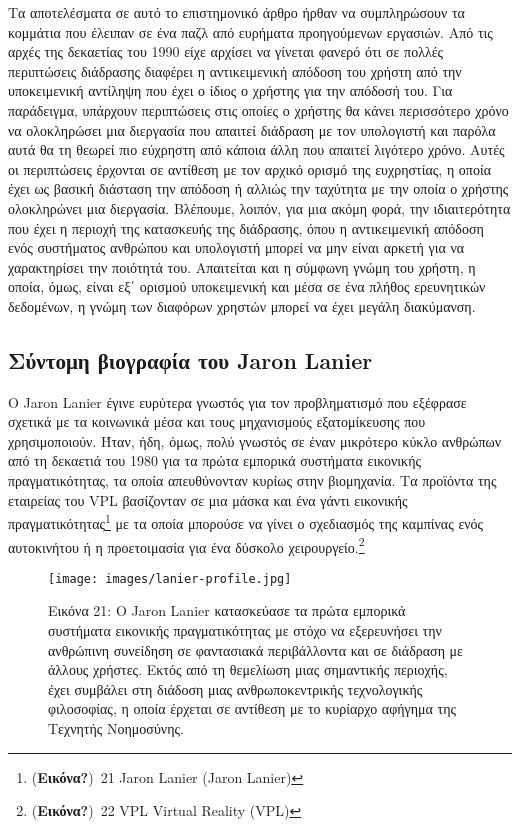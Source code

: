 \documentclass[
]{article}
\begin{document}
Τα αποτελέσματα σε αυτό το επιστημονικό άρθρο ήρθαν να συμπληρώσουν τα
κομμάτια που έλειπαν σε ένα παζλ από ευρήματα προηγούμενων εργασιών. Από
τις αρχές της δεκαετίας του 1990 είχε αρχίσει να γίνεται φανερό ότι σε
πολλές περιπτώσεις διάδρασης διαφέρει η αντικειμενική απόδοση του χρήστη
από την υποκειμενική αντίληψη που έχει ο ίδιος ο χρήστης για την απόδοσή
του. Για παράδειγμα, υπάρχουν περιπτώσεις στις οποίες ο χρήστης θα κάνει
περισσότερο χρόνο να ολοκληρώσει μια διεργασία που απαιτεί διάδραση με
τον υπολογιστή και παρόλα αυτά θα τη θεωρεί πιο εύχρηστη από κάποια άλλη
που απαιτεί λιγότερο χρόνο. Αυτές οι περιπτώσεις έρχονται σε αντίθεση με
τον αρχικό ορισμό της ευχρηστίας, η οποία έχει ως βασική διάσταση την
απόδοση ή αλλιώς την ταχύτητα με την οποία ο χρήστης ολοκληρώνει μια
διεργασία. Βλέπουμε, λοιπόν, για μια ακόμη φορά, την ιδιαιτερότητα που
έχει η περιοχή της κατασκευής της διάδρασης, όπου η αντικειμενική
απόδοση ενός συστήματος ανθρώπου και υπολογιστή μπορεί να μην είναι
αρκετή για να χαρακτηρίσει την ποιότητά του. Απαιτείται και η σύμφωνη
γνώμη του χρήστη, η οποία, όμως, είναι εξ΄ ορισμού υποκειμενική και μέσα
σε ένα πλήθος ερευνητικών δεδομένων, η γνώμη των διαφόρων χρηστών μπορεί
να έχει μεγάλη διακύμανση.

\hypertarget{ux3c3ux3cdux3bdux3c4ux3bfux3bcux3b7-ux3b2ux3b9ux3bfux3b3ux3c1ux3b1ux3c6ux3afux3b1-ux3c4ux3bfux3c5-jaron-lanier}{%
\subsection{Σύντομη βιογραφία του Jaron
Lanier}\label{ux3c3ux3cdux3bdux3c4ux3bfux3bcux3b7-ux3b2ux3b9ux3bfux3b3ux3c1ux3b1ux3c6ux3afux3b1-ux3c4ux3bfux3c5-jaron-lanier}}

Ο Jaron Lanier έγινε ευρύτερα γνωστός για τον προβληματισμό που εξέφρασε
σχετικά με τα κοινωνικά μέσα και τους μηχανισμούς εξατομίκευσης που
χρησιμοποιούν. Ήταν, ήδη, όμως, πολύ γνωστός σε έναν μικρότερο κύκλο
ανθρώπων από τη δεκαετιά του 1980 για τα πρώτα εμπορικά συστήματα
εικονικής πραγματικότητας, τα οποία απευθύνονταν κυρίως στην βιομηχανία.
Τα προϊόντα της εταιρείας του VPL βασίζονταν σε μια μάσκα και ένα γάντι
εικονικής πραγματικότητας\footnote{(\textbf{Εικόνα?})~21 Jaron Lanier
  (Jaron Lanier)} με τα οποία μπορούσε να γίνει ο σχεδιασμός της
καμπίνας ενός αυτοκινήτου ή η προετοιμασία για ένα δύσκολο
χειρουργείο.\footnote{(\textbf{Εικόνα?})~22 VPL Virtual Reality (VPL)}

\leavevmode{}%
\begin{figure}
\hypertarget{fig:lanier-profile}{%
\centering
\texttt{[image: images/lanier-profile.jpg]}
\caption{Εικόνα 21: Ο Jaron Lanier κατασκεύασε τα πρώτα εμπορικά
συστήματα εικονικής πραγματικότητας με στόχο να εξερευνήσει την
ανθρώπινη συνείδηση σε φαντασιακά περιβάλλοντα και σε διάδραση με άλλους
χρήστες. Εκτός από τη θεμελίωση μιας σημαντικής περιοχής, έχει συμβάλει
στη διάδοση μιας ανθρωποκεντρικής τεχνολογικής φιλοσοφίας, η οποία
έρχεται σε αντίθεση με το κυρίαρχο αφήγημα της Τεχνητής
Νοημοσύνης.}\label{fig:lanier-profile}
}
\end{figure}
\end{document}
